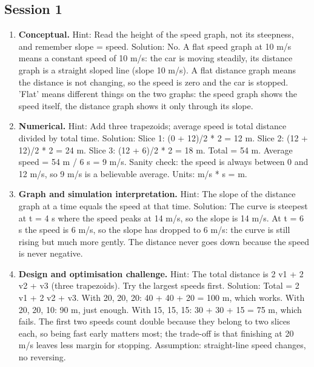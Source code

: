 \documentclass[11pt,a4paper]{article}
\begin{document}
\subsection*{Session 1}
\begin{enumerate}[nosep]
\item \textbf{Conceptual.} Hint: Read the height of the speed graph, not its steepness, and remember slope = speed. Solution: No. A flat speed graph at 10 m/s means a constant speed of 10 m/s: the car is moving steadily, its distance graph is a straight sloped line (slope 10 m/s). A flat distance graph means the distance is not changing, so the speed is zero and the car is stopped. 'Flat' means different things on the two graphs: the speed graph shows the speed itself, the distance graph shows it only through its slope.
\item \textbf{Numerical.} Hint: Add three trapezoids; average speed is total distance divided by total time. Solution: Slice 1: (0 + 12)/2 * 2 = 12 m. Slice 2: (12 + 12)/2 * 2 = 24 m. Slice 3: (12 + 6)/2 * 2 = 18 m. Total = 54 m. Average speed = 54 m / 6 s = 9 m/s. Sanity check: the speed is always between 0 and 12 m/s, so 9 m/s is a believable average. Units: m/s * s = m.
\item \textbf{Graph and simulation interpretation.} Hint: The slope of the distance graph at a time equals the speed at that time. Solution: The curve is steepest at t = 4 s where the speed peaks at 14 m/s, so the slope is 14 m/s. At t = 6 s the speed is 6 m/s, so the slope has dropped to 6 m/s: the curve is still rising but much more gently. The distance never goes down because the speed is never negative.
\item \textbf{Design and optimisation challenge.} Hint: The total distance is 2 v1 + 2 v2 + v3 (three trapezoids). Try the largest speeds first. Solution: Total = 2 v1 + 2 v2 + v3. With 20, 20, 20: 40 + 40 + 20 = 100 m, which works. With 20, 20, 10: 90 m, just enough. With 15, 15, 15: 30 + 30 + 15 = 75 m, which fails. The first two speeds count double because they belong to two slices each, so being fast early matters most; the trade-off is that finishing at 20 m/s leaves less margin for stopping. Assumption: straight-line speed changes, no reversing.
\end{enumerate}
\end{document}
